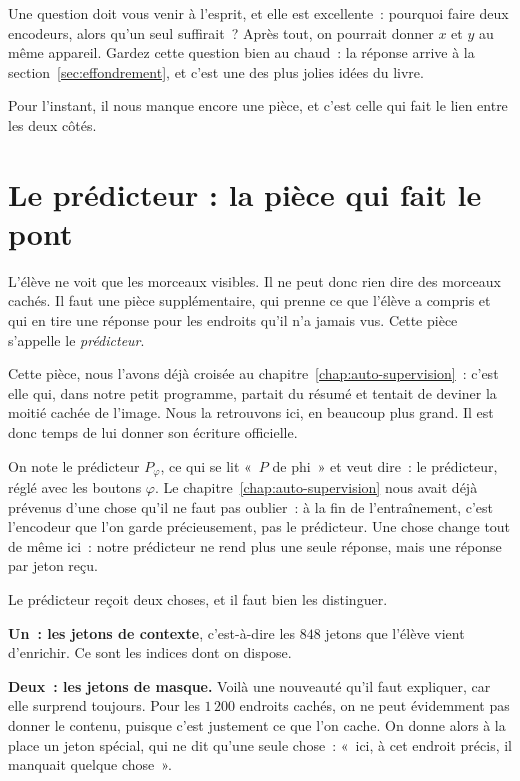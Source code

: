 Une question doit vous venir à l'esprit, et elle est excellente~: pourquoi
faire deux encodeurs, alors qu'un seul suffirait~? Après tout, on pourrait
donner $x$ et $y$ au même appareil. Gardez cette question bien au chaud~: la
réponse arrive à la section~\ref{sec:effondrement}, et c'est une des plus
jolies idées du livre.

Pour l'instant, il nous manque encore une pièce, et c'est celle qui fait le
lien entre les deux côtés.

\section{Le prédicteur : la pièce qui fait le pont}

\begin{enclair}
L'élève ne voit que les morceaux visibles. Il ne peut donc rien dire des
morceaux cachés. Il faut une pièce supplémentaire, qui prenne ce que l'élève
a compris et qui en tire une réponse pour les endroits qu'il n'a jamais vus.
Cette pièce s'appelle le \emph{prédicteur}.
\end{enclair}

Cette pièce, nous l'avons déjà croisée au
chapitre~\ref{chap:auto-supervision}~: c'est elle qui, dans notre petit
programme, partait du résumé et tentait de deviner la moitié cachée de
l'image. Nous la retrouvons ici, en beaucoup plus grand. Il est donc temps
de lui donner son écriture officielle.

\begin{notation}
On note le prédicteur $P_{\varphi}$, ce qui se lit «~$P$ de phi~» et veut
dire~: le prédicteur, réglé avec les boutons $\varphi$. Le
chapitre~\ref{chap:auto-supervision} nous avait déjà prévenus d'une chose
qu'il ne faut pas oublier~: à la fin de l'entraînement, c'est l'encodeur que
l'on garde précieusement, pas le prédicteur. Une chose change tout de même
ici~: notre prédicteur ne rend plus une seule réponse, mais une réponse par
jeton reçu.
\end{notation}

Le prédicteur reçoit deux choses, et il faut bien les distinguer.

\textbf{Un~: les jetons de contexte}, c'est-à-dire les $848$ jetons que
l'élève vient d'enrichir. Ce sont les indices dont on dispose.

\textbf{Deux~: les jetons de masque.} Voilà une nouveauté qu'il faut
expliquer, car elle surprend toujours. Pour les $1\,200$ endroits cachés, on
ne peut évidemment pas donner le contenu, puisque c'est justement ce que
l'on cache. On donne alors à la place un jeton spécial, qui ne dit qu'une
seule chose~: «~ici, à cet endroit précis, il manquait quelque chose~».

